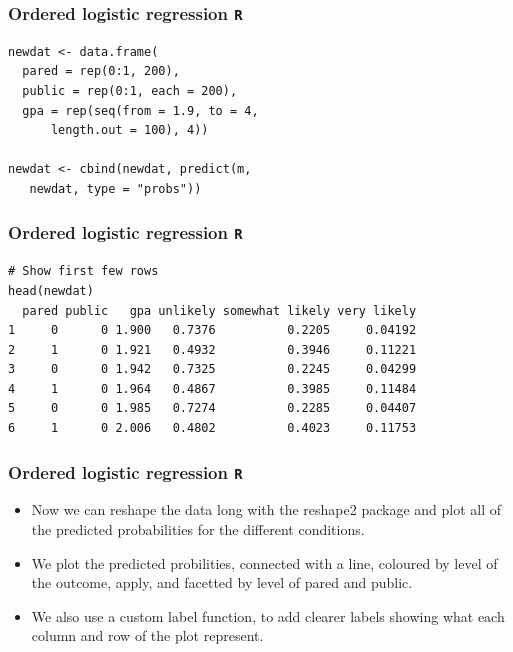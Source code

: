 \documentclass[00-GLMregslides.tex]{subfiles}
\begin{document}
\begin{frame}[fragile]
\frametitle{Ordered logistic regression \texttt{R} }
\Large
\begin{framed}
\begin{verbatim}
newdat <- data.frame(
  pared = rep(0:1, 200),
  public = rep(0:1, each = 200),
  gpa = rep(seq(from = 1.9, to = 4, 
      length.out = 100), 4))

newdat <- cbind(newdat, predict(m, 
   newdat, type = "probs"))

\end{verbatim}
\end{framed}

\end{frame}

\begin{frame}[fragile]
	\frametitle{Ordered logistic regression \texttt{R} }
\normalsize

\begin{verbatim}
# Show first few rows
head(newdat)
  pared public   gpa unlikely somewhat likely very likely
1     0      0 1.900   0.7376          0.2205     0.04192
2     1      0 1.921   0.4932          0.3946     0.11221
3     0      0 1.942   0.7325          0.2245     0.04299
4     1      0 1.964   0.4867          0.3985     0.11484
5     0      0 1.985   0.7274          0.2285     0.04407
6     1      0 2.006   0.4802          0.4023     0.11753
\end{verbatim}


\end{frame}

\begin{frame}[fragile]
	\frametitle{Ordered logistic regression \texttt{R} }
	\Large
	\begin{itemize}
\item Now we can reshape the data long with the reshape2 package and plot all of the predicted probabilities for the different conditions. 
\item We plot the predicted probilities, connected with a line, coloured by level of the outcome, apply, and facetted by level of pared and public.
\item We also use a custom label function, to add clearer labels showing what each column and row of the plot represent.
\end{itemize}
\end{frame}
\end{document}
